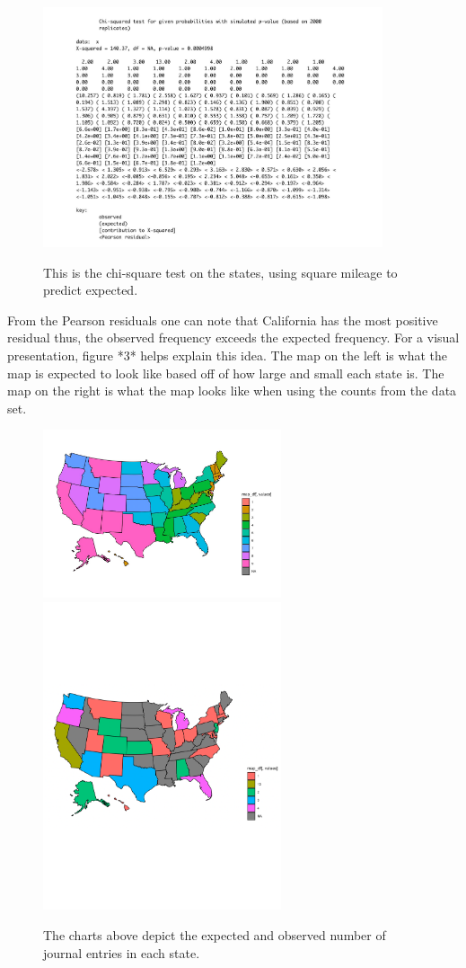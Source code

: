 \documentclass[12pt, letterpaper]{article}
\begin{document}
\begin{figure}[h]
\begin{center}
\includegraphics[width=10cm]{chi-state.pdf}
\label{fig: Chi-Square Test: States}
\caption{This is the chi-square test on the states, using square mileage to predict expected.}
\end{center}
\end{figure}

From the Pearson residuals one can note that California has the most positive residual thus, the observed frequency exceeds the expected frequency. For a visual presentation, figure *3* helps explain this idea. The map on the left is what the map is expected to look like based off of how large and small each state is. The map on the right is what the map looks like when using the counts from the data set. 

\begin{figure}[h]
	\includegraphics[width=7cm]{maps.pdf}
	\includegraphics[width=7cm]{observed-map.pdf}
	\label{fig: Expected Frequency based on Square Mileage vs Observed Frequency}
	\caption{The charts above depict the expected and observed number of journal entries in each state.}
\end{figure}
\end{document}
